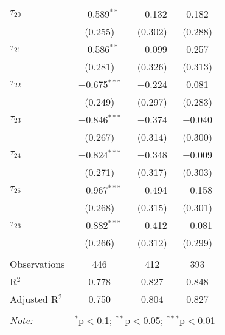 \begin{tabular}{@{\extracolsep{5pt}}lccc}
 $\tau_{20}$ & $-$0.589$^{**}$ & $-$0.132 & 0.182 \\ 
  & (0.255) & (0.302) & (0.288) \\ 
   
 $\tau_{21}$ & $-$0.586$^{**}$ & $-$0.099 & 0.257 \\ 
  & (0.281) & (0.326) & (0.313) \\ 
   
 $\tau_{22}$ & $-$0.675$^{***}$ & $-$0.224 & 0.081 \\ 
  & (0.249) & (0.297) & (0.283) \\ 
   
 $\tau_{23}$ & $-$0.846$^{***}$ & $-$0.374 & $-$0.040 \\ 
  & (0.267) & (0.314) & (0.300) \\ 
   
 $\tau_{24}$ & $-$0.824$^{***}$ & $-$0.348 & $-$0.009 \\ 
  & (0.271) & (0.317) & (0.303) \\ 
   
 $\tau_{25}$ & $-$0.967$^{***}$ & $-$0.494 & $-$0.158 \\ 
  & (0.268) & (0.315) & (0.301) \\ 
   
 $\tau_{26}$ & $-$0.882$^{***}$ & $-$0.412 & $-$0.081 \\ 
  & (0.266) & (0.312) & (0.299) \\ 
   
\hline \\[-1.8ex] 
Observations & 446 & 412 & 393 \\ 
R$^{2}$ & 0.778 & 0.827 & 0.848 \\ 
Adjusted R$^{2}$ & 0.750 & 0.804 & 0.827 \\ 
\hline 
\hline \\[-1.8ex] 
\textit{Note:}  & \multicolumn{3}{r}{$^{*}$p$<$0.1; $^{**}$p$<$0.05; $^{***}$p$<$0.01} \\ 
\end{tabular} 